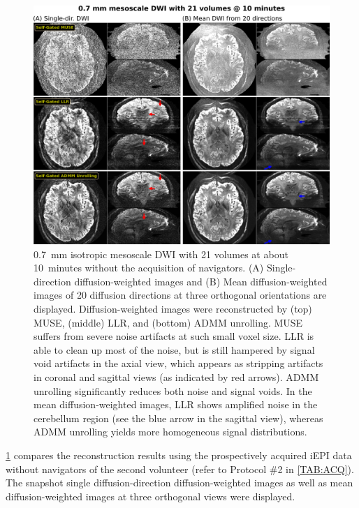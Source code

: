 \documentclass[journal,twoside,web]{ieeecolor}
\begin{document}
	\begin{figure}
		\centering
		\includegraphics[width=\textwidth]{../figures/fig5.png}
		\caption{0.7~mm isotropic mesoscale DWI with 21 volumes at about 10~minutes
			without the acquisition of navigators.
			(A) Single-direction diffusion-weighted images and
			(B) Mean diffusion-weighted images of 20 diffusion directions
			at three orthogonal orientations are displayed.
			Diffusion-weighted images were reconstructed by
			(top) MUSE, (middle) LLR, and (bottom) ADMM unrolling.
			MUSE suffers from severe noise artifacts at such small voxel size.
			LLR is able to clean up most of the noise,
			but is still hampered by signal void artifacts in the axial view,
			which appears as stripping artifacts in coronal and sagittal views
			(as indicated by red arrows).
			ADMM unrolling significantly reduces both noise and signal voids.
			In the mean diffusion-weighted images, LLR shows amplified noise
			in the cerebellum region (see the blue arrow in the sagittal view),
			whereas ADMM unrolling yields more homogeneous signal distributions.}
		\label{FIG:MOTION_PROS}
	\end{figure}

	\cref{FIG:MOTION_PROS} compares the reconstruction results
	using the prospectively acquired iEPI data without navigators
	of the second volunteer
	(refer to Protocol \#2 in \cref{TAB:ACQ}).
	The snapshot single diffusion-direction diffusion-weighted images
	as well as mean diffusion-weighted images 
	at three orthogonal views were displayed.
	
\end{document}
